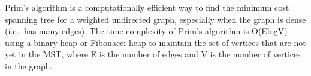 \documentclass{article}
\begin{document}
Prim's algorithm is a computationally efficient way to find the minimum cost spanning tree for a weighted undirected graph, especially when the graph is dense (i.e., has many edges). The time complexity of Prim's algorithm is O(ElogV) using a binary heap or Fibonacci heap to maintain the set of vertices that are not yet in the MST, where E is the number of edges and V is the number of vertices in the graph.
\end{document}
